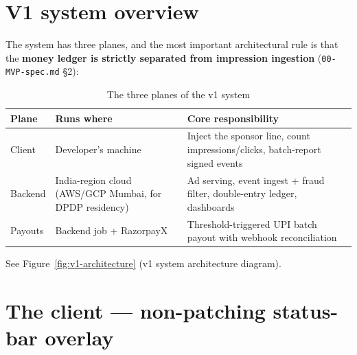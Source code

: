 \section{V1 system overview}
\label{sec:v1-overview}

The system has three planes, and the most important architectural rule is that the \textbf{money ledger is strictly separated from impression ingestion} (\texttt{00-MVP-spec.md} \S2):

\begin{table}[htbp]
\centering
\caption{The three planes of the v1 system}
\label{tab:three-planes}
\begin{tabular}{p{} p{} p{}}
\toprule
\textbf{Plane} & \textbf{Runs where} & \textbf{Core responsibility} \\
\midrule
Client & Developer's machine & Inject the sponsor line, count impressions/clicks, batch-report signed events \\
Backend & India-region cloud (AWS/GCP Mumbai, for DPDP residency) & Ad serving, event ingest + fraud filter, double-entry ledger, dashboards \\
Payouts & Backend job + RazorpayX & Threshold-triggered UPI batch payout with webhook reconciliation \\
\bottomrule
\end{tabular}
\end{table}

See Figure~\ref{fig:v1-architecture} (v1 system architecture diagram).

\section{The client --- non-patching status-bar overlay}
\label{sec:client}

